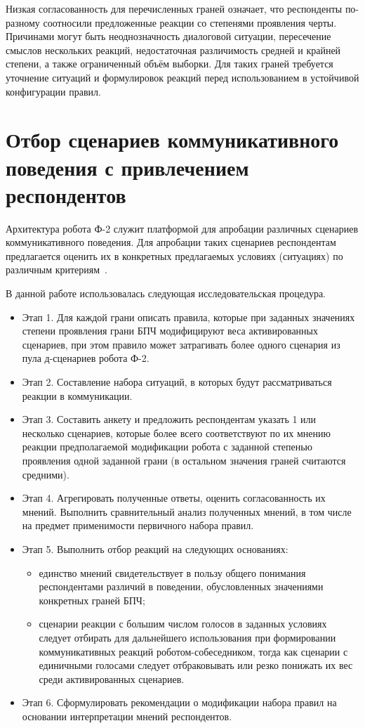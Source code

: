 Низкая согласованность для перечисленных граней означает, что респонденты
по-разному соотносили предложенные реакции со степенями проявления черты.
Причинами могут быть неоднозначность диалоговой ситуации, пересечение смыслов
нескольких реакций, недостаточная различимость средней и крайней степени, а также ограниченный объём выборки.
Для таких граней требуется уточнение ситуаций и формулировок реакций перед использованием в устойчивой конфигурации правил.

\section{Отбор сценариев коммуникативного поведения с привлечением респондентов}

Архитектура робота Ф-2 служит платформой для апробации различных сценариев коммуникативного поведения.
Для апробации таких сценариев респондентам предлагается оценить их в конкретных предлагаемых условиях (ситуациях) по различным критериям~\cite{volkova2024crowdsourcing}.

В данной работе использовалась следующая исследовательская процедура.

\begin{itemize}
	\item Этап 1. Для каждой грани описать правила, которые при заданных значениях степени проявления грани БПЧ модифицируют веса активированных сценариев, при этом правило может затрагивать более одного сценария из пула д-сценариев робота Ф-2.
	\item Этап 2. Составление набора ситуаций, в которых будут рассматриваться реакции в коммуникации.
	\item Этап 3. Составить анкету и предложить респондентам указать 1 или несколько сценариев, которые более всего соответствуют по их мнению реакции предполагаемой модификации робота с заданной степенью проявления одной заданной грани (в остальном значения граней считаются средними).
	\item Этап 4. Агрегировать полученные ответы, оценить согласованность их мнений. Выполнить сравнительный анализ полученных мнений, в том числе на предмет применимости первичного набора правил.
	\item Этап 5. Выполнить отбор реакций на следующих основаниях:
	\begin{itemize}
		\item единство мнений свидетельствует в пользу общего понимания респондентами различий в поведении, обусловленных значениями конкретных граней БПЧ;
		\item сценарии реакции с большим числом голосов в заданных условиях следует отбирать для дальнейшего использования при формировании коммуникативных реакций роботом-собеседником, тогда как сценарии с единичными голосами следует отбраковывать или резко понижать их вес среди активированных сценариев.
	\end{itemize}
	\item Этап 6. Сформулировать рекомендации о модификации набора правил на основании интерпретации мнений респондентов.
\end{itemize}

